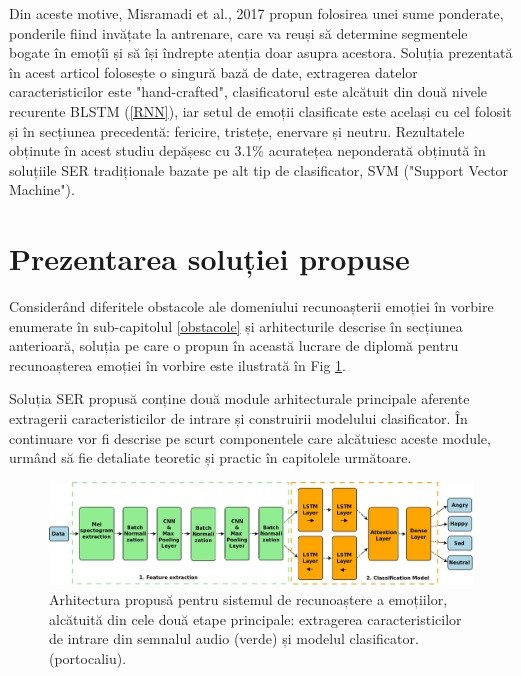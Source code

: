 \documentclass[a4paper,12pt]{book}
\newcounter{Figcount}
\begin{document}
					 Din aceste motive, Misramadi et al., 2017 \cite{misramadi} propun folosirea unei sume ponderate, ponderile fiind invățate la antrenare, care va reuși să determine segmentele bogate în emoțîi și să își îndrepte atenția doar asupra acestora. 					 
					 Soluția prezentată în acest articol folosește o singură bază de date, extragerea datelor caracteristicilor este "hand-crafted", clasificatorul este alcătuit din două nivele recurente BLSTM (\ref{RNN}), iar setul de emoții clasificate este același cu cel folosit și în secțiunea precedentă: fericire, tristețe, enervare și neutru. Rezultatele obținute în acest studiu depășesc cu 3.1\% acuratețea neponderată obținută în soluțiile SER tradiționale bazate pe alt tip de clasificator, SVM ("Support Vector Machine").
					 
				\section{Prezentarea soluției propuse} \label{solutie}
					Considerând diferitele obstacole ale domeniului recunoașterii emoției în vorbire enumerate în sub-capitolul \ref{obstacole} și arhitecturile descrise în secțiunea anterioară, soluția pe care o propun în această lucrare de diplomă pentru recunoașterea emoției în vorbire este ilustrată în Fig \ref{fig:model}. \par
					Soluția SER propusă conține două module arhitecturale principale aferente extragerii caracteristicilor de intrare și construirii modelului clasificator. În continuare vor fi descrise pe scurt componentele care alcătuiesc aceste module, urmând să fie detaliate teoretic și practic în capitolele următoare. \par
						
					
					\begin{figure}[t]
						\noindent
						\hspace*{-1cm}
						\includegraphics[scale=0.290]{Sistem_Diagram}
						\caption{Arhitectura propusă pentru sistemul de recunoaștere a emoțiilor, alcătuită din cele două etape principale: extragerea caracteristicilor de intrare din semnalul audio (verde) și modelul clasificator. (portocaliu).}
						\label{fig:model}
						
					\end{figure}
				
\end{document}
